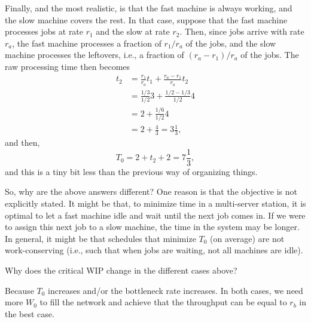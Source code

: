 \begin{exercise}
\begin{solution}
 Finally, and the most realistic, is that the fast machine is
 always working, and the slow machine covers the rest. In that
 case, suppose that the fast machine processes jobs at rate $r_1$
 and the slow at rate $r_2$. Then, since jobs arrive with rate
 $r_a$, the fast machine processes a fraction of $r_1/r_a$ of the
 jobs, and the slow machine processes the leftovers, i.e., a
 fraction of $(r_a-r_1)/r_a$ of the jobs. The raw processing time then becomes
 \begin{equation*}
 \begin{split}
 t_2 
&= \frac{r_1}{r_a} t_1 + \frac{r_a-r_1}{r_a} t_2 \\
&= \frac{1/3}{1/2} 3 + \frac{1/2-1/3}{1/2} 4 \\
&= 2 + \frac{1/6}{1/2} 4 \\
&= 2 + \frac{4}{3} = 3\frac13,
 \end{split}
 \end{equation*}
and then,
\begin{equation*}
 T_0 = 2 + t_2 + 2 = 7\frac13,
\end{equation*}
and this is a tiny bit less than the previous way of organizing things. 

So, why are the above answers different? One reason is that the
objective is not explicitly stated. It might be that, to minimize time
in a multi-server station, it is optimal to let a fast machine idle
and wait until the next job comes in. If we were to assign this next
job to a slow machine, the time in the system may be longer. In
general, it might be that schedules that minimize $T_0$ (on average)
are not work-conserving (i.e., such that when jobs are waiting, not
all machines are idle).
\end{solution}
\end{exercise}


\begin{exercise}
Why does the critical WIP change in the different cases above? 
\begin{solution}
 Because $T_0$ increases and/or the bottleneck rate increases. In
 both cases, we need more $W_0$ to fill the network and achieve that
 the throughput can be equal to $r_b$ in the best case.
\end{solution}
\end{exercise}

